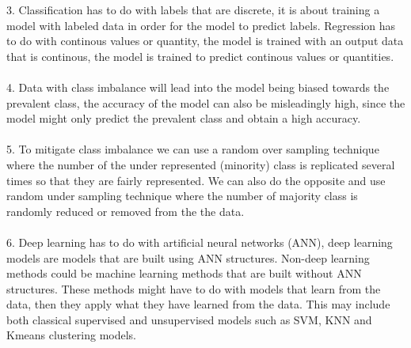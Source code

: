 \documentclass[12pt,a4paper]{article}
\begin{document}
3. Classification has to do with labels that are discrete, it is about training a model with labeled data in order for the model to predict labels. Regression has to do with continous values or quantity, the model is trained with an output data that is continous, the model is trained to predict continous values or quantities.\\
\\
4. Data with class imbalance will lead into the model being biased towards the prevalent class, the accuracy of the model can also be misleadingly high, since the model might only predict the prevalent class and obtain a high accuracy.\\
\\
5. To mitigate class imbalance we can use a random over sampling technique where the number of the under represented (minority) class is replicated several times so that they are fairly represented. We can also do the opposite and use random under sampling technique where the number of majority class is randomly reduced or removed from the the data.\\
\\
6. Deep learning has to do with artificial neural networks (ANN), deep learning models are models that are built using ANN structures. Non-deep learning methods could be machine learning methods that are built without ANN structures. These methods might have  to do with models that learn from the data, then they apply what they have learned from the data. This may include both classical supervised and unsupervised models such as SVM, KNN and Kmeans clustering models. 
\end{document}
